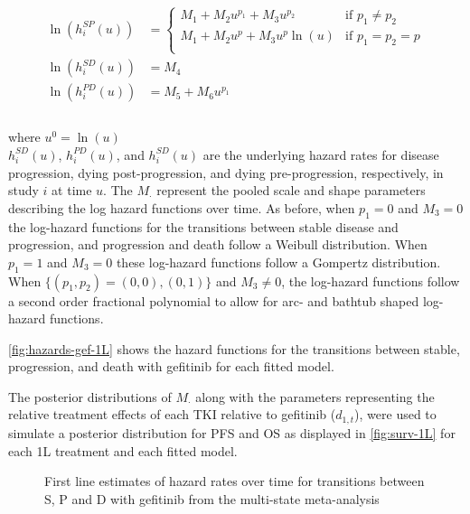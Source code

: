 \documentclass[11pt,final,fleqn]{article}\usepackage[]{graphicx}\usepackage[]{color}
\theoremstyle{plain}
\begin{document}
{\begin{equation}\label{eqn:multistate-ma}
\begin{aligned} 
\ln\left(h_{i}^{SP}(u)\right) &= 
\begin{cases}
M_{1} + M_{2}u^{p_1} + M_{3}u^{p_2} & \text{if } p_1 \neq p_2 \\ 
M_{1} + M_{2}u^{p} + M_{3}u^{p}\ln(u) & \text{if } p_1 = p_2 = p \\ 
\end{cases}\\ 
\ln\left(h_{i}^{SD}(u)\right) &=
M_{4}\\
\ln\left(h_{i}^{PD}(u)\right) &=
M_{5} + M_{6}u^{p_1}\\ 
\\
\end{aligned}
\end{equation}

where $u^0= \ln(u)$
\\

$h_{i}^{SD}(u)$, $h_{i}^{PD}(u)$, and $h_{i}^{SD}(u)$ are the underlying hazard rates for disease progression, dying post-progression, and dying pre-progression, respectively, in study $i$ at time $u$. The $M_{\cdot}$ represent the pooled scale and shape parameters describing the log hazard functions over time. As before, when $p_{1}=0$ and $M_{3}=0$ the log-hazard functions for the transitions between stable disease and progression, and progression and death follow a Weibull distribution. When $p_{1}=1$ and $M_{3}=0$ these log-hazard functions follow a Gompertz distribution. When $\{(p_1, p_2) = (0, 0), (0,1)\}$ and $M_{3}\neq0$, the log-hazard functions follow a second order fractional polynomial to allow for arc- and bathtub shaped log-hazard functions. 

\autoref{fig:hazards-gef-1L} shows the hazard functions for the transitions between stable, progression, and death with gefitinib for each fitted model.

The posterior distributions of $M_{\cdot}$ along with the parameters representing the relative treatment effects of each TKI relative to gefitinib ($d_{1, t}$), were used to simulate a posterior distribution for PFS and OS as displayed in \autoref{fig:surv-1L} for each 1L treatment and each fitted model. 


\begin{figure}[h]
\centering
\caption{First line estimates of hazard rates over time for transitions between S, P and D with gefitinib from the multi-state meta-analysis}\label{fig:hazards-gef-1L}
\end{figure}


}
\end{document}
